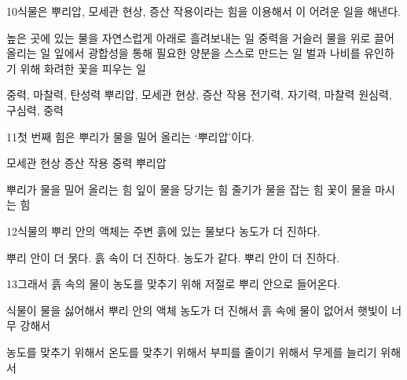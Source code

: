 \documentclass[fs85,seriesRus]{korfarm-base}
\begin{document}
\begin{kfSentenceUnit}{10}{식물은 뿌리압, 모세관 현상, 증산 작용이라는 힘을 이용해서 이 어려운 일을 해낸다.}
\begin{kfChoices}
\kfChoice 높은 곳에 있는 물을 자연스럽게 아래로 흘려보내는 일
\kfChoice 중력을 거슬러 물을 위로 끌어올리는 일
\kfChoice 잎에서 광합성을 통해 필요한 양분을 스스로 만드는 일
\kfChoice 벌과 나비를 유인하기 위해 화려한 꽃을 피우는 일
\end{kfChoices}
\begin{kfChoices}
\kfChoice 중력, 마찰력, 탄성력
\kfChoice 뿌리압, 모세관 현상, 증산 작용
\kfChoice 전기력, 자기력, 마찰력
\kfChoice 원심력, 구심력, 중력
\end{kfChoices}
\end{kfSentenceUnit}

\begin{kfSentenceUnit}{11}{첫 번째 힘은 뿌리가 물을 밀어 올리는 ‘뿌리압’이다.}
\begin{kfChoices}
\kfChoice 모세관 현상
\kfChoice 증산 작용
\kfChoice 중력
\kfChoice 뿌리압
\end{kfChoices}
\begin{kfChoices}
\kfChoice 뿌리가 물을 밀어 올리는 힘
\kfChoice 잎이 물을 당기는 힘
\kfChoice 줄기가 물을 잡는 힘
\kfChoice 꽃이 물을 마시는 힘
\end{kfChoices}
\end{kfSentenceUnit}

\begin{kfSentenceUnit}{12}{식물의 뿌리 안의 액체는 주변 흙에 있는 물보다 농도가 더 진하다.}
\begin{kfChoices}
\kfChoice 뿌리 안이 더 묽다.
\kfChoice 흙 속이 더 진하다.
\kfChoice 농도가 같다.
\kfChoice 뿌리 안이 더 진하다.
\end{kfChoices}
\end{kfSentenceUnit}

\begin{kfSentenceUnit}{13}{그래서 흙 속의 물이 농도를 맞추기 위해 저절로 뿌리 안으로 들어온다.}
\begin{kfChoices}
\kfChoice 식물이 물을 싫어해서
\kfChoice 뿌리 안의 액체 농도가 더 진해서
\kfChoice 흙 속에 물이 없어서
\kfChoice 햇빛이 너무 강해서
\end{kfChoices}
\begin{kfChoices}
\kfChoice 농도를 맞추기 위해서
\kfChoice 온도를 맞추기 위해서
\kfChoice 부피를 줄이기 위해서
\kfChoice 무게를 늘리기 위해서
\end{kfChoices}
\end{kfSentenceUnit}
\end{document}
